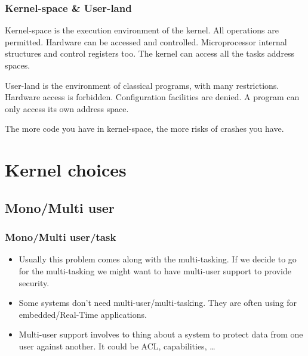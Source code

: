 \begin{frame}
  \frametitle{Kernel-space \& User-land}

  Kernel-space is the execution environment of the kernel. All operations are permitted. Hardware can be accessed and controlled. Microprocessor internal structures and control registers too. The kernel can access all the tasks address spaces.

  \-

  User-land is the environment of classical programs, with many restrictions. Hardware access is forbidden. Configuration facilities are denied. A program can only access its own address space.

  \-

  The more code you have in kernel-space, the more risks of crashes you
  have.

\end{frame}

%
%

\section{Kernel choices}

\subsection{Mono/Multi user}
\begin{frame}
  \frametitle{Mono/Multi user/task}
  \begin{itemize}
        \item Usually this problem comes along with the multi-tasking.
        If we decide to go for the multi-tasking we might want to have multi-user support to provide security.
        \item Some systems don't need multi-user/multi-tasking. They are often using for embedded/Real-Time applications.
        \item Multi-user support involves to thing about a system to protect data from one user against another. It could be ACL, capabilities, \ldots
  \end{itemize}
\end{frame}


